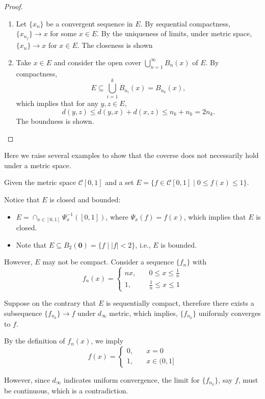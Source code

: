 \begin{proof}
\begin{enumerate}
\item
Let $\{x_n\}$ be a convergent sequence in $E$. By sequential compactness, $\{x_{n_j}\}\to x$ for some $x\in E$. By the uniqueness of limits, under metric space, $\{x_n\}\to x$ for $x\in E$. The closeness is shown
\item
Take $x\in E$ and consider the open cover $\bigcup_{n=1}^\infty B_n(x)$ of $E$. By compactness, 
\[
E\subseteq\bigcup_{i=1}^kB_{n_i}(x)=B_{n_k}(x),
\]
which implies that for any $y,z\in E$,
\[
d(y,z)\le d(y,x)+d(x,z)\le n_k+n_k=2n_k.
\]
The boundness is shown.
\end{enumerate}
\end{proof}

Here we raise several examples to show that the coverse does not necessarily hold under a metric space.

\begin{example}
Given the metric space $\mathcal{C}[0,1]$ and a set $E=\{f\in\mathcal{C}[0,1]\mid0\le f(x)\le 1\}$.

Notice that $E$ is closed and bounded:
\begin{itemize}
\item
$E=\cap_{x\in[0,1]}\Psi_x^{-1}([0,1])$, where $\Psi_x(f)=f(x)$, which implies that $E$ is closed.
\item
Note that $E\subseteq B_2(\bm0)=\{f\mid |f|<2\}$, i.e., $E$ is bounded.
\end{itemize}

However, $E$ may not be compact. Consider a sequence $\{f_n\}$ with
\[
f_n(x)=\left\{
\begin{aligned}
nx,&\quad0\le x\le\frac{1}{n}\\
1,&\quad\frac{1}{n}\le x\le 1
\end{aligned}
\right.
\]

Suppose on the contrary that $E$ is sequentially compact, therefore there exists a subsequence $\{f_{n_k}\}\to f$ under $d_\infty$ metric, which implies, $\{f_{n_k}\}$ uniformly converges to $f$.

By the definition of $f_n(x)$, we imply
\[
f(x)=\left\{
\begin{aligned}
0,&\quad x=0\\
1,&\quad x\in(0,1]
\end{aligned}
\right.
\]

However, since $d_\infty$ indicates uniform convergence, the limit for $\{f_{n_k}\}$, say $f$, must be continuous, which is a contradiction.

\end{example}



